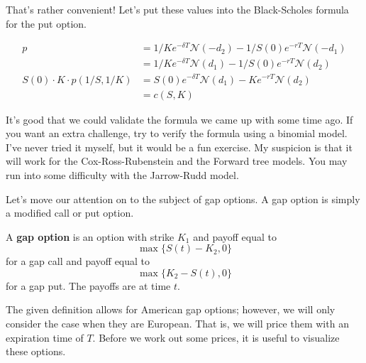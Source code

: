 \documentclass{ximera}
\begin{document}
That's rather convenient! Let's put these values into the Black-Scholes formula for the put option.

\begin{align*}
p 					&=1/Ke^{-\delta T}\mathcal{N}(-d_2)-1/S(0)e^{-rT}\mathcal{N}(-d_1)\\
					&=1/Ke^{-\delta T}\mathcal{N}(d_1)-1/S(0)e^{-rT}\mathcal{N}(d_2)\\
S(0)\cdot K\cdot p(1/S,1/K) 	&=S(0)e^{-\delta T}\mathcal{N}(d_1)-Ke^{-rT}\mathcal{N}(d_2)\\
					&=c(S,K)
\end{align*}

It's good that we could validate the formula we came up with some time ago. If you want an extra challenge, try to verify the formula using a binomial model. I've never tried it myself, but it would be a fun exercise. My suspicion is that it will work for the Cox-Ross-Rubenstein and the Forward tree models. You may run into some difficulty with the Jarrow-Rudd model.

Let's move our attention on to the subject of gap options. A gap option is simply a modified call or put option. 

\begin{definition}
A {\bf gap option} is an option with strike $K_1$ and payoff equal to 
	\begin{equation*}
	\max\{S(t)-K_2,0\}
	\end{equation*}
for a gap call and payoff equal to 
	\begin{equation*}
	\max\{K_2-S(t),0\}
	\end{equation*}
for a gap put. The payoffs are at time $t$.
\end{definition}

The given definition allows for American gap options; however, we will only consider the case when they are European. That is, we will price them with an expiration time of $T$. Before we work out some prices, it is useful to visualize these options. 
\end{document}
